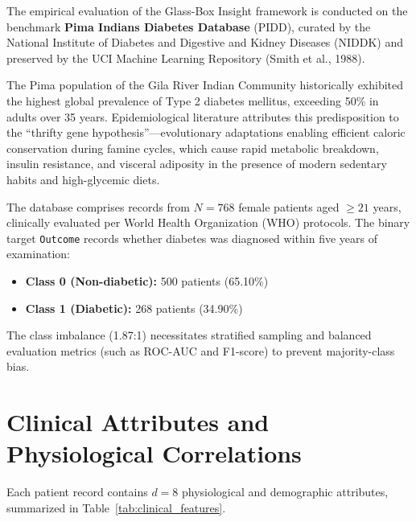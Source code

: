\documentclass{report}
\begin{document}
The empirical evaluation of the Glass-Box Insight framework is conducted on the benchmark \textbf{Pima Indians Diabetes Database} (PIDD), curated by the National Institute of Diabetes and Digestive and Kidney Diseases (NIDDK) and preserved by the UCI Machine Learning Repository (Smith et al., 1988).

The Pima population of the Gila River Indian Community historically exhibited the highest global prevalence of Type 2 diabetes mellitus, exceeding 50\% in adults over 35 years. Epidemiological literature attributes this predisposition to the ``thrifty gene hypothesis''—evolutionary adaptations enabling efficient caloric conservation during famine cycles, which cause rapid metabolic breakdown, insulin resistance, and visceral adiposity in the presence of modern sedentary habits and high-glycemic diets.

The database comprises records from $N = 768$ female patients aged $\ge 21$ years, clinically evaluated per World Health Organization (WHO) protocols. The binary target \texttt{Outcome} records whether diabetes was diagnosed within five years of examination:
\begin{itemize}
    \setlength{\itemsep}{0pt}
    \setlength{\parskip}{0pt}
    \item \textbf{Class 0 (Non-diabetic):} 500 patients (65.10\%)
    \item \textbf{Class 1 (Diabetic):} 268 patients (34.90\%)
\end{itemize}
The class imbalance (1.87:1) necessitates stratified sampling and balanced evaluation metrics (such as ROC-AUC and F1-score) to prevent majority-class bias.

\section{Clinical Attributes and Physiological Correlations}

Each patient record contains $d = 8$ physiological and demographic attributes, summarized in Table~\ref{tab:clinical_features}.
\end{document}
